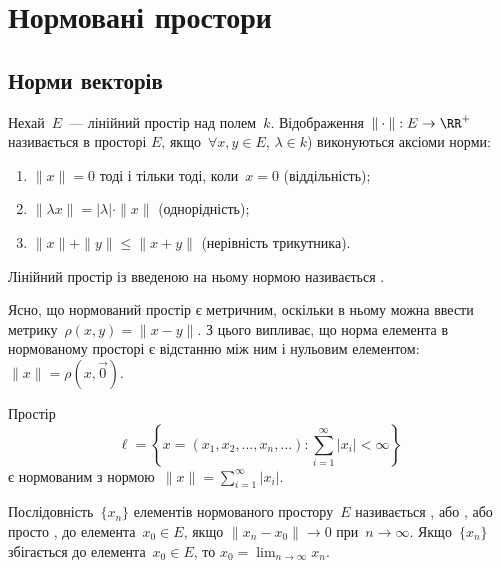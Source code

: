 \chapter{Нормовані простори}

\section{Норми векторів}

\begin{definition}
Нехай~$E$~--- лінійний простір над полем~$k$.
Відображення~$\|\cdot\|: E \to \RR^+$ називається  в просторі
$E$, якщо~$\forall x, y \in E$, $\lambda \in k$) виконуються аксіоми норми:
\begin{enumerate}
\item $\|x\| = 0$ тоді і тільки тоді, коли~$x = 0$ (віддільність);
\item $\|\lambda x\| = |\lambda| \cdot \|x\|$ (однорідність);
\item $\|x\| + \|y\| \le \|x + y\|$ (нерівність трикутника).
\end{enumerate}
\end{definition}

\begin{definition}
Лінійний простір із введеною на ньому нормою
називається .
\end{definition}

\begin{remark}
Ясно, що нормований простір є метричним, оскільки в
ньому можна ввести метрику~$\rho(x, y) = \|x - y\|$. З цього
випливає, що норма елемента в нормованому просторі є
відстанню між ним і нульовим елементом: $\|x\| = \rho(x, \vec 0)$.
\end{remark}

\begin{example}
Простір
\begin{equation*}
    \ell = \left\{ x = (x_1, x_2, \dots, x_n, \dots): \sum_{i = 1}^\infty |x_i| < \infty \right\}
\end{equation*}
є нормованим з нормою~$\|x\| = \sum_{i = 1}^\infty |x_i|$.
\end{example}

\begin{definition}
Послідовність~$\{x_n\}$ елементів нормованого
простору~$E$ називається , або , або просто , до елемента~$x_0 \in E$, якщо
$\|x_n - x_0\| \to 0$ при~$n \to \infty$.
Якщо~$\{x_n\}$ збігається до елемента~$x_0 \in E$, то
$x_0 = \lim_{n \to \infty} x_n$.
\end{definition}

